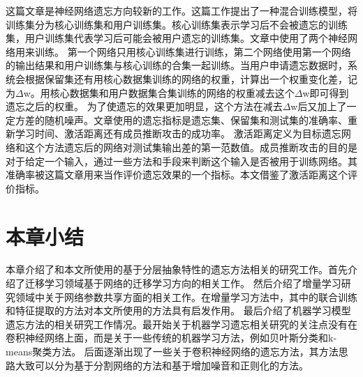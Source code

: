这篇文章\cite{Golatkar_2021_CVPR}是神经网络遗忘方向较新的工作。这篇工作提出了一种混合训练模型，将训练集分为核心训练集和用户训练集。核心训练集表示学习后不会被遗忘的训练集，用户训练集代表学习后可能会被用户遗忘的训练集。文章中使用了两个神经网络用来训练。
第一个网络只用核心训练集进行训练，第二个网络使用第一个网络的输出结果和用户训练集与核心训练的合集一起训练。当用户申请遗忘数据时，系统会根据保留集还有用核心数据集训练的网络的权重，计算出一个权重变化差，记为$\Delta$w。用核心数据集和用户数据集合集训练的网络的权重减去这个$\Delta$w即可得到遗忘之后的权重。
为了使遗忘的效果更加明显，这个方法在减去$\Delta$w后又加上了一定方差的随机噪声。文章使用的遗忘指标是遗忘集、保留集和测试集的准确率、重新学习时间、激活距离还有成员推断攻击的成功率。
激活距离定义为目标遗忘网络和这个方法遗忘后的网络对测试集输出差的第一范数值。成员推断攻击的目的是对于给定一个输入，通过一些方法和手段来判断这个输入是否被用于训练网络。其准确率被这篇文章用来当作评价遗忘效果的一个指标。本文借鉴了激活距离这个评价指标。

\section{本章小结}
本章介绍了和本文所使用的基于分层抽象特性的遗忘方法相关的研究工作。首先介绍了迁移学习领域基于网络的迁移学习方向的相关工作。
然后介绍了增量学习研究领域中关于网络参数共享方面的相关工作。在增量学习方法中，其中的联合训练和特征提取的方法对本文所使用的方法具有启发作用。
最后介绍了机器学习模型遗忘方法的相关研究工作情况。最开始关于机器学习遗忘相关研究的关注点没有在卷积神经网络上面，而是关于一些传统的机器学习方法，例如贝叶斯分类和k-means聚类方法。
后面逐渐出现了一些关于卷积神经网络的遗忘方法，其方法思路大致可以分为基于分割网络的方法和基于增加噪音和正则化的方法。
